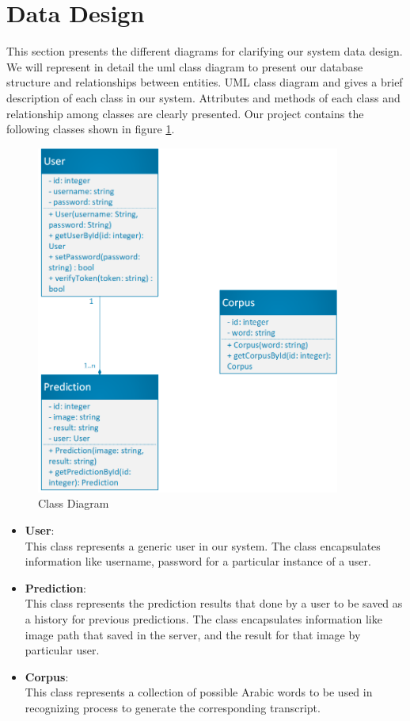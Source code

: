 \section{Data Design}
This section presents the different diagrams for clarifying our system data design. We will represent in detail the \acrshort{uml} class diagram to present our database structure and relationships between entities. UML class diagram and gives a brief description of each class in our system. Attributes and methods of each class and relationship among classes are clearly presented. Our project contains the following classes shown in figure \ref{fig:class-digram}.

\begin{figure}[!htb]
    \centering
    \includegraphics[width=10cm]{images/class diagram.png}
    \caption{Class Diagram}
    \label{fig:class-digram}
\end{figure}

\begin{itemize}[itemsep=1pt, topsep=5pt]
    \item   \textbf{User}: \\
    This class represents a generic user in our system. The class encapsulates information like username, password for a particular instance of a user.
    \item   \textbf{Prediction}: \\
    This class represents the prediction results that done by a user to be saved as a history for previous predictions. The class encapsulates information like image path that saved in the server, and the result for that image by particular user. 
    \item   \textbf{Corpus}: \\
    This class represents a collection of possible Arabic words to be used in recognizing process to generate the corresponding transcript.
\end{itemize}  

